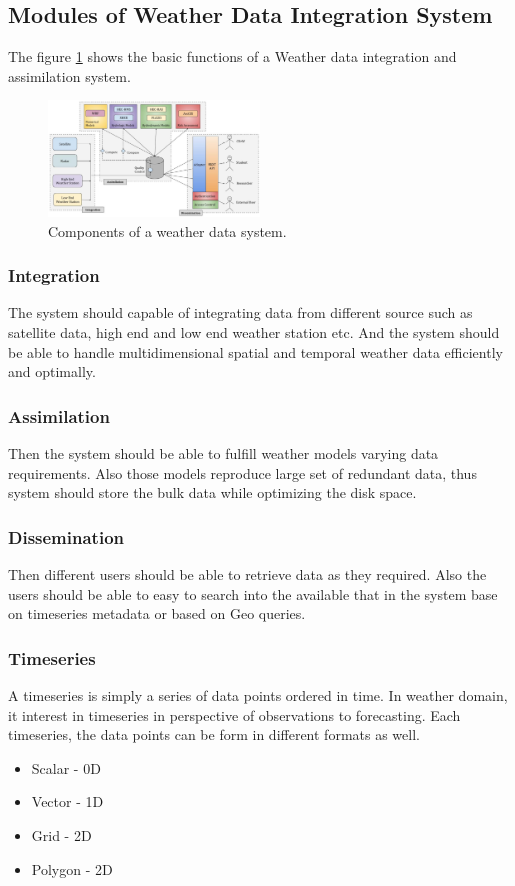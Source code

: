 \subsection{Modules of Weather Data Integration System}
\label{subse:modules_weather_data_integration_sys}

The figure \ref{fi:wdia_components} shows the basic functions of a Weather data integration and assimilation system.
\begin{figure}[htbp]
\centerline{\includegraphics[width=0.5\textwidth]{method/misc/weather_data_system_components.jpg}}
\caption{Components of a weather data system.}
\label{fi:wdia_components}
\end{figure}
\subsubsection{Integration}
The system should capable of integrating data from different source such as satellite data, high end and low end weather station etc. And the system should be able to handle multidimensional spatial and temporal weather data efficiently and optimally. 
\subsubsection{Assimilation}
Then the system should be able to fulfill weather models varying data requirements. Also those models reproduce large set of redundant data, thus system should store the bulk data while optimizing the disk space.
\subsubsection{Dissemination}
Then different users should be able to retrieve data as they required. Also the users should be able to easy to search into the available that in the system base on timeseries metadata or based on Geo queries.

\subsubsection{Timeseries}
A timeseries is simply a series of data points ordered in time. In weather domain, it interest in timeseries in perspective of observations to forecasting.
Each timeseries, the data points can be form in different formats as well.
\begin{itemize} 
    \item Scalar - 0D
    \item Vector - 1D
    \item Grid - 2D
    \item Polygon - 2D
\end{itemize}
    
